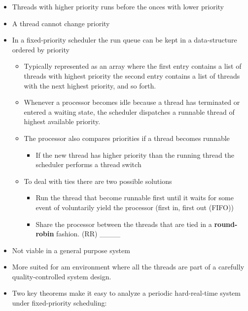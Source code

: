 \documentclass[11pt]{article}
\providecommand{\tightlist}{%
      \setlength{\itemsep}{0pt}\setlength{\parskip}{0pt}}
\begin{document}
\begin{itemize}
\tightlist
\item
  Threads with higher priority runs before the onces with lower priority
\item
  A thread cannot change priority
\item
  In a fixed-priority scheduler the run queue can be kept in a
  data-structure ordered by priority

  \begin{itemize}
  \tightlist
  \item
    Typically represented as an array where the first entry contains a
    list of threads with highest priority the second entry contains a
    list of threads with the next highest priority, and so forth.
  \item
    Whenever a processor becomes idle because a thread has terminated or
    entered a waiting state, the scheduler dispatches a runnable thread
    of highest available priority.
  \item
    The processor also compares priorities if a thread becomes runnable

    \begin{itemize}
    \tightlist
    \item
      If the new thread has higher priority than the running thread the
      scheduler performs a thread switch
    \end{itemize}
  \item
    To deal with ties there are two possible solutions

    \begin{itemize}
    \tightlist
    \item
      Run the thread that become runnable first until it waits for some
      event of voluntarily yield the processor (first in, first out
      (FIFO))
    \item
      Share the processor between the threads that are tied in a
      \textbf{round-robin} fashion. (RR) \_\_\_\_
    \end{itemize}
  \end{itemize}
\item
  Not viable in a general purpose system
\item
  More suited for am environment where all the threads are part of a
  carefully quality-controlled system design.
\item
  Two key theorems make it easy to analyze a periodic hard-real-time
  system under fixed-priority scheduling:


\end{itemize}
\end{document}
